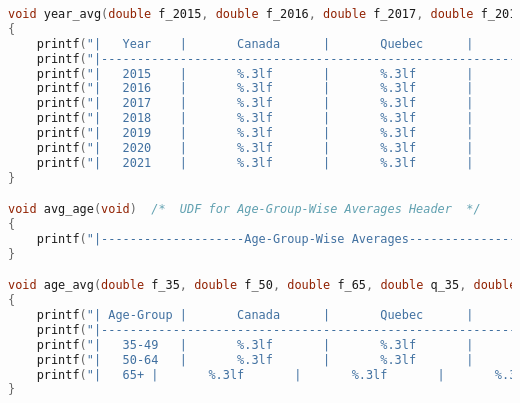 \begin{lstlisting}[language=C, caption=\textit{CPS 188 Term Project Source Code}]
void year_avg(double f_2015, double f_2016, double f_2017, double f_2018, double f_2019, double f_2020, double f_2021, double q_2015, double q_2016, double q_2017, double q_2018, double q_2019, double q_2020, double q_2021, double o_2015, double o_2016, double o_2017, double o_2018, double o_2019, double o_2020, double o_2021, double a_2015, double a_2016, double a_2017, double a_2018, double a_2019, double a_2020, double a_2021, double b_2015, double b_2016, double b_2017, double b_2018, double b_2019, double b_2020, double b_2021)	/*	UDF to print Year-Wise Averages in a tabular form	*/
{
	printf("|	Year	|		Canada		|		Quebec		|		Ontario		|		Alberta		|		British Columbia		|\n");
	printf("|-----------------------------------------------------------------------------------------------------------------------------------------------------------------------------------------------|\n");
	printf("|	2015	|		%.3lf		|		%.3lf		|		%.3lf		|		%.3lf		|			%.3lf			|\n", f_2015, q_2015, o_2015, a_2015, b_2015);
	printf("|	2016	|		%.3lf		|		%.3lf		|		%.3lf		|		%.3lf		|			%.3lf			|\n", f_2016, q_2016, o_2016, a_2016, b_2016);
	printf("|	2017	|		%.3lf		|		%.3lf		|		%.3lf		|		%.3lf		|			%.3lf			|\n", f_2017, q_2017, o_2017, a_2017, b_2017);
	printf("|	2018	|		%.3lf		|		%.3lf		|		%.3lf		|		%.3lf		|			%.3lf			|\n", f_2018, q_2018, o_2018, a_2018, b_2018);
	printf("|	2019	|		%.3lf		|		%.3lf		|		%.3lf		|		%.3lf		|			%.3lf			|\n", f_2019, q_2019, o_2019, a_2019, b_2019);
	printf("|	2020	|		%.3lf		|		%.3lf		|		%.3lf		|		%.3lf		|			%.3lf			|\n", f_2020, q_2020, o_2020, a_2020, b_2020);
	printf("|	2021	|		%.3lf		|		%.3lf		|		%.3lf		|		%.3lf		|			%.3lf			|\n", f_2021, q_2021, o_2021, a_2021, b_2021);
}

void avg_age(void)	/*	UDF for Age-Group-Wise Averages Header	*/
{
	printf("|--------------------Age-Group-Wise Averages--------------------|\n");
}

void age_avg(double f_35, double f_50, double f_65, double q_35, double q_50, double q_65, double o_35, double o_50, double o_65, double a_35, double a_50, double a_65, double b_35, double b_50, double b_65)	/*	UDF to print Age-Group-Wise Averages in a tabular form	*/
{
	printf("| Age-Group	|		Canada		|		Quebec		|		Ontario		|		Alberta		|		British Columbia		|\n");
	printf("|-----------------------------------------------------------------------------------------------------------------------------------------------------------------------------------------------|\n");
	printf("|	35-49	|		%.3lf		|		%.3lf		|		%.3lf		|		%.3lf		|			%.3lf			|\n", f_35, q_35, o_35, a_35, b_35);
	printf("|	50-64	|		%.3lf		|		%.3lf		|		%.3lf		|		%.3lf		|			%.3lf			|\n", f_50, q_50, o_50, a_50, b_50);
	printf("|	65+	|		%.3lf		|		%.3lf		|		%.3lf		|		%.3lf		|			%.3lf			|\n", f_65, q_65, o_65, a_65, b_65);
}



\end{lstlisting}
        
